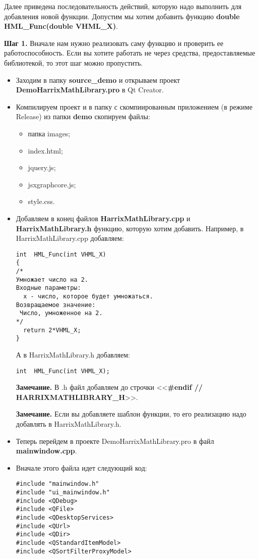 Далее приведена последовательность действий, которую надо выполнить для добавления новой функции. Допустим мы хотим добавить функцию  \textbf{double HML\_Func(double VHML\_X)}.

\textbf{Шаг 1.}\label{step1} Вначале нам нужно реализовать саму функцию и проверить ее работоспособность. Если вы хотите работать не через средства, предоставляемые библиотекой, то этот шаг можно пропустить.

\begin{itemize}
\item Заходим в папку \textbf{source\_demo} и открываем проект \textbf{DemoHarrixMathLibrary.pro} в Qt Creator.
\item Компилируем проект и в папку с скомпиированным приложением (в режиме Release) из папки \textbf{demo} скопируем файлы:
\begin{itemize}
\item  папка images;
\item  index.html;
\item  jquery.js;
\item  jsxgraphcore.js;
\item  style.css.
\end {itemize}
\item Добавляем в конец файлов \textbf{HarrixMathLibrary.cpp} и \textbf{HarrixMathLibrary.h} функцию, которую хотим добавить. Например, в HarrixMathLibrary.cpp добавляем:
\begin{lstlisting}[label=examplefunction01, caption=Что добавляем в HarrixMathLibrary.cpp]
int  HML_Func(int VHML_X)
{
/*
Умножает число на 2.
Входные параметры:
  x - число, которое будет умножаться.
Возвращаемое значение:
 Число, умноженное на 2.
*/
  return 2*VHML_X;
}
\end{lstlisting}
А в HarrixMathLibrary.h добавляем:
\begin{lstlisting}[label=examplefunction02, caption=Что добавляем в HarrixMathLibrary.h]
int  HML_Func(int VHML_X);
\end{lstlisting}
\textbf{Замечание.} В .h файл добавляем до строчки <<\textbf{\#endif // HARRIXMATHLIBRARY\_H}>>.

\textbf{Замечание.} Если вы добавляете шаблон функции, то его реализацию надо добавлять в HarrixMathLibrary.h.
\item Теперь перейдем в проекте DemoHarrixMathLibrary.pro в файл \textbf{mainwindow.cpp}.
\item Вначале этого файла идет следующий код:
\begin{lstlisting}[label=examplefunction03, caption=mainwindow.cpp]
#include "mainwindow.h"
#include "ui_mainwindow.h"
#include <QDebug>
#include <QFile>
#include <QDesktopServices>
#include <QUrl>
#include <QDir>
#include <QStandardItemModel>
#include <QSortFilterProxyModel>


\end{lstlisting}
\end{itemize}
